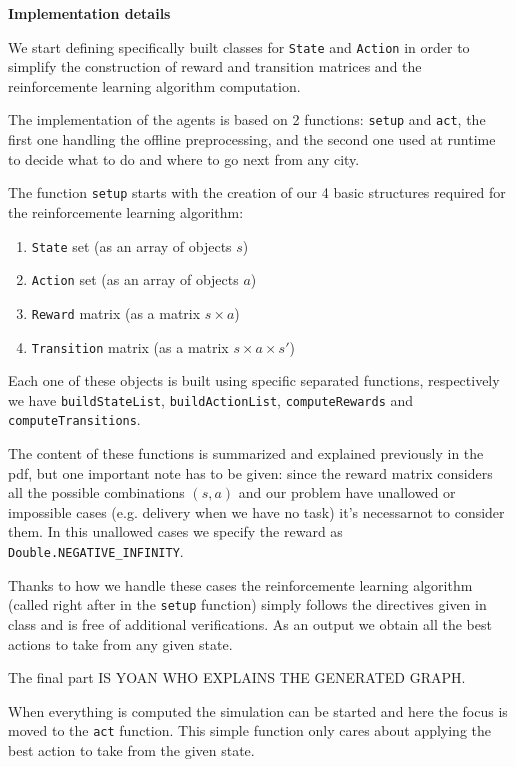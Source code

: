 \documentclass[11pt,a4paper]{article}
\begin{document}
\bigskip
\textbf{Implementation details}

We start defining specifically built classes for \texttt{State} and \texttt{Action} in order to simplify the construction of reward and transition matrices and the reinforcemente learning algorithm computation.

The implementation of the agents is based on 2 functions: \texttt{setup} and \texttt{act}, the first one handling the offline preprocessing, and the second one used at runtime to decide what to do and where to go next from any city.

The function \texttt{setup} starts with the creation of our 4 basic structures required for the reinforcemente learning algorithm:
\begin{enumerate}
	\item{\texttt{State} set (as an array of objects $s$)}
	\item{\texttt{Action} set (as an array of objects $a$)}
	\item{\texttt{Reward} matrix (as a matrix $s \times a$)}
	\item{\texttt{Transition} matrix (as a matrix $s \times a \times s'$)}
\end{enumerate}

Each one of these objects is built using specific separated functions, respectively we have \texttt{buildStateList}, \texttt{buildActionList}, \texttt{computeRewards} and \texttt{computeTransitions}.

The content of these functions is summarized and explained previously in the pdf, but one important note has to be given: since the reward matrix considers all the possible combinations $(s, a)$ and our problem have unallowed or impossible cases (e.g. delivery when we have no task) it's necessarnot to consider them. In this unallowed cases we specify the reward as \texttt{Double.NEGATIVE\_INFINITY}.

Thanks to how we handle these cases the reinforcemente learning algorithm (called right after in the \texttt{setup} function) simply follows the directives given in class and is free of additional verifications. As an output we obtain all the best actions to take from any given state.

The final part IS YOAN WHO EXPLAINS THE GENERATED GRAPH.\newline


When everything is computed the simulation can be started and here the focus is moved to the \texttt{act} function. This simple function only cares about applying the best action to take from the given state.
\end{document}
